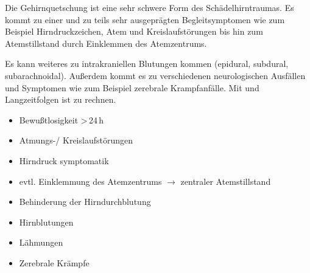 {
Die Gehirnquetschung ist eine sehr schwere Form des
Schädelhirntraumas. Es kommt zu einer  und zu teils sehr ausgeprägten
Begleitsymptomen wie zum Beispiel Hirndruckzeichen, Atem und
Kreislaufstörungen bis hin zum Atemstillstand durch Einklemmen
des Atemzentrums. 

Es kann weiteres zu intrakraniellen
Blutungen kommen (epidural, subdural, subarachnoidal).
Außerdem kommt es zu verschiedenen neurologischen Ausfällen
und Symptomen wie zum Beispiel zerebrale
Krampfanfälle. Mit  und Langzeitfolgen ist
zu rechnen.
}{
\begin{itemize}
    \item Bewußtlosigkeit  {\textgreater}\,24\,h
    \item Atmungs-/ Kreislaufstörungen
    \item Hirndruck symptomatik
    \item evtl. Einklemmung des Atemzentrums ${\rightarrow}$
    zentraler Atemstillstand
    \item Behinderung der Hirndurchblutung
    \item Hirnblutungen
    \item Lähmungen
    \item Zerebrale Krämpfe
\end{itemize}
}{}{}{}






